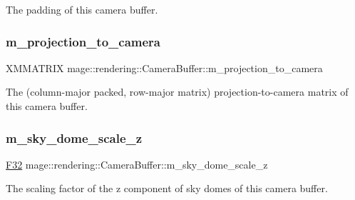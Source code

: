 The padding of this camera buffer. \hypertarget{structmage_1_1rendering_1_1_camera_buffer_a9cb9e0e4005d55b72668bbdcf4a27218}{}\label{structmage_1_1rendering_1_1_camera_buffer_a9cb9e0e4005d55b72668bbdcf4a27218} 
\subsubsection{\texorpdfstring{m\+\_\+projection\+\_\+to\+\_\+camera}{m\_projection\_to\_camera}}
{\footnotesize\ttfamily X\+M\+M\+A\+T\+R\+IX mage\+::rendering\+::\+Camera\+Buffer\+::m\+\_\+projection\+\_\+to\+\_\+camera}

The (column-\/major packed, row-\/major matrix) projection-\/to-\/camera matrix of this camera buffer. \hypertarget{structmage_1_1rendering_1_1_camera_buffer_abfb4dbb9a228b6a7412b09b179fd157d}{}\label{structmage_1_1rendering_1_1_camera_buffer_abfb4dbb9a228b6a7412b09b179fd157d} 
\subsubsection{\texorpdfstring{m\+\_\+sky\+\_\+dome\+\_\+scale\+\_\+z}{m\_sky\_dome\_scale\_z}}
{\footnotesize\ttfamily \hyperlink{namespacemage_aa97e833b45f06d60a0a9c4fc22ae02c0}{F32} mage\+::rendering\+::\+Camera\+Buffer\+::m\+\_\+sky\+\_\+dome\+\_\+scale\+\_\+z}

The scaling factor of the z component of sky domes of this camera buffer. \hypertarget{structmage_1_1rendering_1_1_camera_buffer_a05e17b19f87ca2a5cb5c75cf04e2796c}{}\label{structmage_1_1rendering_1_1_camera_buffer_a05e17b19f87ca2a5cb5c75cf04e2796c} 
